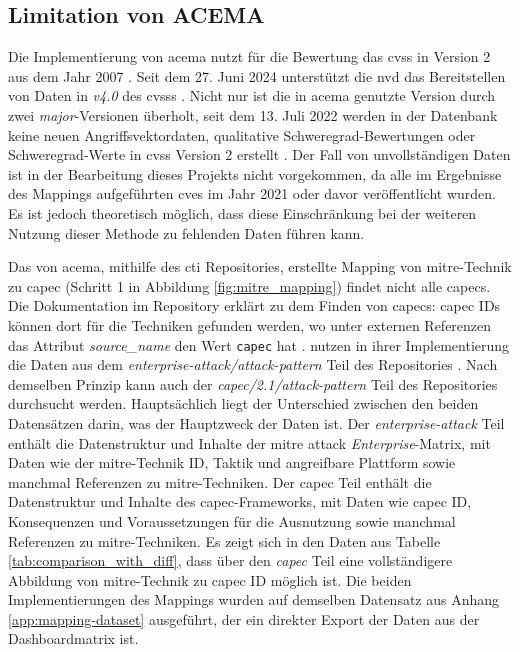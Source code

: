 \subsection{Limitation von ACEMA}
\label{limitationen-acema}
Die Implementierung von \gls{acema} nutzt für die Bewertung das \gls{cvss} in Version 2 aus dem Jahr 2007 \autocite{Acema_oranOCloud_Data_GatheringpyMaster}. Seit dem 27. Juni 2024 unterstützt die \gls{nvd} das Bereitstellen von Daten in \textit{v4.0} des \gls{cvss}s \autocite{NVDCVSSV40}. Nicht nur ist die in \gls{acema} genutzte Version durch zwei \textit{major}-Versionen überholt, seit dem 13. Juli 2022 werden in der Datenbank keine neuen Angriffsvektordaten, qualitative Schweregrad-Bewertungen oder Schweregrad-Werte in \gls{cvss} Version 2 erstellt \autocite{RetirementCVSSV2}. Der Fall von unvollständigen Daten ist in der Bearbeitung dieses Projekts nicht vorgekommen, da alle im Ergebnisse des Mappings aufgeführten \glspl{cve} im Jahr 2021 oder davor veröffentlicht wurden. Es ist jedoch theoretisch möglich, dass diese Einschränkung bei der weiteren Nutzung dieser Methode zu fehlenden Daten führen kann.
%
\par Das von \gls{acema}, mithilfe des \gls{cti} Repositories, erstellte Mapping von \gls{mitre}-Technik zu \gls{capec} (Schritt 1 in Abbildung \ref{fig:mitre_mapping}) findet nicht alle \glspl{capec}. Die Dokumentation im Repository erklärt zu dem Finden von \glspl{capec}: \gls{capec} IDs können dort für die Techniken gefunden werden, wo unter externen Referenzen das Attribut \textit{source\_name} den Wert \verb|capec| hat \autocite{CtiUSAGEmdMaster} \autocite{CtiUSAGECAPECmdMaster}. \citeauthor{klementSecuring6GTransition2024} nutzen in ihrer Implementierung die Daten aus dem \textit{enterprise-attack/attack-pattern} Teil des Repositories \autocite{klement2023acema}. Nach demselben Prinzip kann auch der \textit{capec/2.1/attack-pattern} Teil des Repositories durchsucht werden. Hauptsächlich liegt der Unterschied zwischen den beiden Datensätzen darin, was der Hauptzweck der Daten ist. Der \textit{enterprise-attack} Teil enthält die Datenstruktur und Inhalte der \gls{mitre} \gls{attack} \textit{Enterprise}-Matrix, mit Daten wie der \gls{mitre}-Technik ID, Taktik und angreifbare Plattform sowie manchmal Referenzen zu \gls{mitre}-Techniken. Der \gls{capec} Teil enthält die Datenstruktur und Inhalte des \gls{capec}-Frameworks, mit Daten wie \gls{capec} ID, Konsequenzen und Voraussetzungen für die Ausnutzung sowie manchmal Referenzen zu \gls{mitre}-Techniken. Es zeigt sich in den Daten aus Tabelle \ref{tab:comparison_with_diff}, dass über den \textit{\gls{capec}} Teil eine vollständigere Abbildung von \gls{mitre}-Technik zu \gls{capec} ID möglich ist. Die beiden Implementierungen des Mappings wurden auf demselben Datensatz aus Anhang \ref{app:mapping-dataset} ausgeführt, der ein direkter Export der Daten aus der Dashboardmatrix ist.
%

